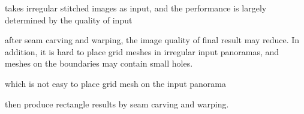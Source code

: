 \documentclass[10pt,journal,compsoc]{IEEEtran}
\begin{document}
takes irregular stitched images as input, and the performance is largely determined by the quality of input



after seam carving and warping, the image quality of final result may reduce. In addition, it is hard to place grid meshes in irregular input panoramas, and meshes on the boundaries may contain small holes.



which is not easy to place grid mesh on the input panorama


then produce rectangle results by seam carving and warping.



%






\end{document}
